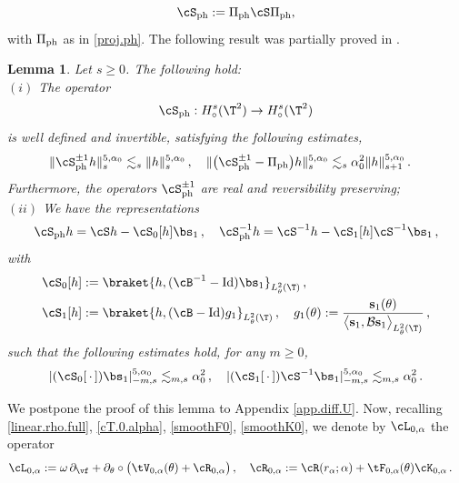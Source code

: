 \documentclass[a4paper,reqno,10pt]{article}
\newtheorem{lem}{Lemma}[section]
\newcommand{\pa}{\partial}
\begin{document}
$$
\cS_{\rm ph} := \Pi_{\rm ph} \cS \Pi_{\rm ph},
$$
with $\Pi_{\rm ph}$ as in \eqref{proj.ph}. The   following result was partially proved in \cite{HR21}.
	\begin{lem}\label{Lema-decompMon}
			 Let $s\geq 0$. The following hold:
    \\[1mm]
    \noindent $(i)$ The operator
	\begin{equation}\label{S.proj}
		\cS_{\rm ph}  : H_\circ^s(\T^2) \to H_\circ^s(\T^2) 
	\end{equation}
	is well defined and invertible, satisfying the following estimates,
    \begin{align}
		&	\| \cS_{\rm ph}^{\pm 1} h \|_{s}^{5,\alpha_{0}}\lesssim_{s} \| h \|_{s}^{5,\alpha_{0}}\,, \quad  	\| \big(\cS_{\rm ph}^{\pm 1} -\Pi_{\rm ph}\big)h \|_{s}^{5,\alpha_{0}}\lesssim_{s} \alpha_{0}^2 \| h \|_{s+1}^{5,\alpha_{0}} \,.
	\end{align}
     Furthermore, the operators $\cS_{\rm ph}^{\pm 1}$ are real and reversibility preserving;
     \\[1mm]
    \noindent $(ii)$
		We have the representations
        \begin{align}
            \cS_{\rm ph} h = \cS h - \cS_{0}[h] \bs_{1} \,, \quad \cS_{\rm ph}^{-1} h = \cS^{-1} h - \cS_{1}[h] \cS^{-1}\bs_{1}\,, \label{representations}
        \end{align}
        with
        \begin{align}
            \cS_{0}[h]&:= \braket{h,(\cB^{-1}-{\rm Id})\bs_{1}}_{L_\theta^2(\T)} \,, \\
            \cS_{1}[h]&:= \braket{h,(\cB-{\rm Id})g_{1}}_{L_\theta^2(\T)} \,, \quad g_1(\theta):=\frac{\mathbf{s}_1(\theta)}{\big\langle \mathbf{s}_1,\mathcal{B}\mathbf{s}_1\big\rangle_{L^2_\theta(\T)}}\,, \label{g1.S}
        \end{align}
        such that the following estimates hold, for any $m\geq 0$,
        \begin{equation}
            |(\cS_{0}[\,\cdot\,]) \bs_{1}|_{-m,s}^{5,\alpha_{0}} \lesssim_{m,s} \alpha_{0}^2 \,, \quad |(\cS_{1}[\,\cdot\,]) \cS^{-1}\bs_{1}|_{-m,s}^{5,\alpha_{0}} \lesssim_{m,s} \alpha_{0}^2 \,. \label{est.repre}
        \end{equation}
			\end{lem}
We postpone the proof of this lemma to Appendix \ref{app.diff.U}.
Now,  recalling \eqref{linear.rho.full}, \eqref{cT.0.alpha}, \eqref{smoothF0}, \eqref{smoothK0}, we denote by $\cL_{0,\alpha}$ the operator
	\begin{align}\label{cL0.alpha}
		\cL_{0,\alpha} & := \omega\, \pa_{\vf} + \pa_{\theta}\circ \big( \tV_{0,\alpha}(\theta) + \cR_{0,\alpha} \big) \,, \quad \cR_{0,\alpha} := \cR(r_\alpha;\alpha) + \tF_{0,\alpha}(\theta) \cK_{0,\alpha} \,.
	\end{align}
\end{document}
